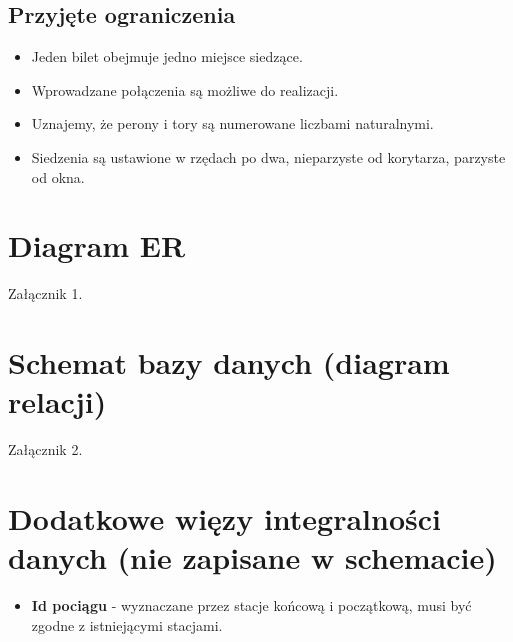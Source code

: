 \subsection{Przyjęte ograniczenia}
\begin{itemize}
    \item Jeden bilet obejmuje jedno miejsce siedzące.
    \item Wprowadzane połączenia są możliwe do realizacji.
    \item Uznajemy, że perony i tory są numerowane liczbami naturalnymi.
    \item Siedzenia są ustawione w rzędach po dwa, nieparzyste od korytarza, parzyste od okna.
\end{itemize}

\section{Diagram ER}
Załącznik 1.

\section{Schemat bazy danych (diagram relacji)}
Załącznik 2.

\section{Dodatkowe więzy integralności danych (nie zapisane w schemacie)}
\begin{itemize}
    \item \textbf{Id pociągu} - wyznaczane przez stacje końcową i początkową, musi być zgodne z istniejącymi stacjami.
\end{itemize}

